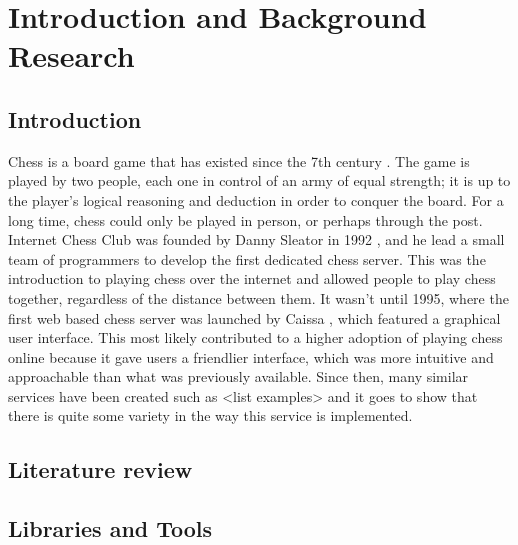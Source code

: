 \chapter{Introduction and Background Research}

\label{chapter1}

\section{Introduction}

Chess is a board game that has existed since the 7th century \cite{AHistoryOfChess}. The game is played by two people, each one in control of an army of equal strength; it is up to the player's logical reasoning and deduction in order to conquer the board. For a long time, chess could only be played in person, or perhaps through the post. Internet Chess Club was founded by Danny Sleator in 1992 \cite{InternetChessClub}, and he lead a small team of programmers to develop the first dedicated chess server. This was the introduction to playing chess over the internet and allowed people to play chess together, regardless of the distance between them. It wasn't until 1995, where the first web based chess server was launched by Caissa \cite{Caissa}, which featured a graphical user interface. This most likely contributed to a higher adoption of playing chess online because it gave users a friendlier interface, which was more intuitive and approachable than what was previously available. Since then, many similar services have been created such as <list examples> and it goes to show that there is quite some variety in the way this service is implemented.


\section{Literature review}

\section{Libraries and Tools}
